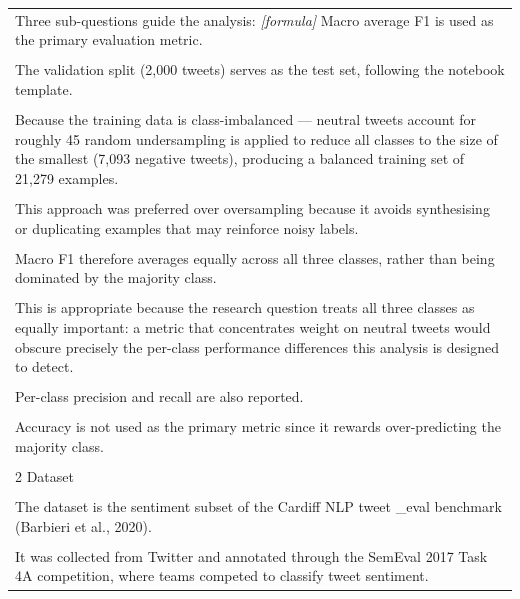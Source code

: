\documentclass[11pt]{article}
\begin{document}
\begin{longtable}{|p{\dimexpr\linewidth-2\tabcolsep-2\arrayrulewidth\relax}|}
\hline
\rule{0pt}{3.5cm} \\
\hline
Three sub-questions guide the analysis: \textit{[formula]} Macro average F1 is used as the primary evaluation metric. \\[2pt]
\hline
\rule{0pt}{3.5cm} \\
\hline
The validation split (2,000 tweets) serves as the test set, following the notebook template. \\[2pt]
\hline
\rule{0pt}{3.5cm} \\
\hline
Because the training data is class-imbalanced --- neutral tweets account for roughly 45 random undersampling is applied to reduce all classes to the size of the smallest (7,093 negative tweets), producing a balanced training set of 21,279 examples. \\[2pt]
\hline
\rule{0pt}{3.5cm} \\
\hline
This approach was preferred over oversampling because it avoids synthesising or duplicating examples that may reinforce noisy labels. \\[2pt]
\hline
\rule{0pt}{3.5cm} \\
\hline
Macro F1 therefore averages equally across all three classes, rather than being dominated by the majority class. \\[2pt]
\hline
\rule{0pt}{3.5cm} \\
\hline
This is appropriate because the research question treats all three classes as equally important: a metric that concentrates weight on neutral tweets would obscure precisely the per-class performance differences this analysis is designed to detect. \\[2pt]
\hline
\rule{0pt}{3.5cm} \\
\hline
Per-class precision and recall are also reported. \\[2pt]
\hline
\rule{0pt}{3.5cm} \\
\hline
Accuracy is not used as the primary metric since it rewards over-predicting the majority class. \\[2pt]
\hline
\rule{0pt}{3.5cm} \\
\hline
2 Dataset \\[2pt]
\hline
\rule{0pt}{3.5cm} \\
\hline
The dataset is the sentiment subset of the Cardiff NLP tweet \_eval benchmark (Barbieri et al., 2020). \\[2pt]
\hline
\rule{0pt}{3.5cm} \\
\hline
It was collected from Twitter and annotated through the SemEval 2017 Task 4A competition, where teams competed to classify tweet sentiment. \\[2pt]

\end{longtable}
\end{document}
